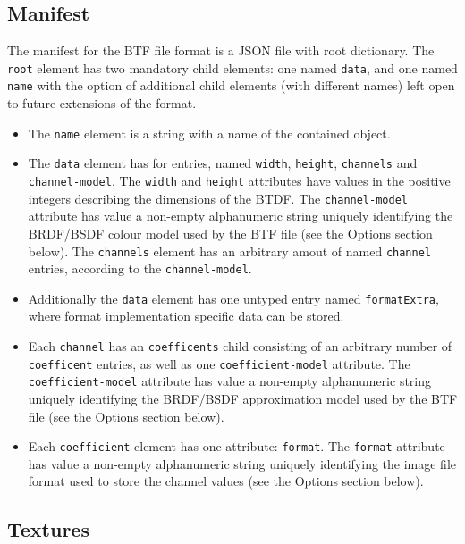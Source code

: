 \hypertarget{manifest}{%
\subsection{Manifest}\label{manifest}}

The manifest for the BTF file format is a JSON file with root
dictionary. The \texttt{root} element has two mandatory child elements:
one named \texttt{data}, and one named \texttt{name} with the option of
additional child elements (with different names) left open to future
extensions of the format.
\begin{itemize}
\item The \texttt{name} element is a string with a
name of the contained object.
\item The \texttt{data} element has for
entries, named \texttt{width}, \texttt{height}, \texttt{channels} and
\texttt{channel-model}. The \texttt{width} and \texttt{height}
attributes have values in the positive integers describing the
dimensions of the BTDF. The \texttt{channel-model} attribute has value a
non-empty alphanumeric string uniquely identifying the BRDF/BSDF colour
model used by the BTF file (see the Options section below). The \texttt{channels} element has an arbitrary amout of
named \texttt{channel} entries, according to the \texttt{channel-model}.
\item Additionally the \texttt{data} element has one untyped entry named
\texttt{formatExtra}, where format implementation specific data can be
stored.
\item Each \texttt{channel} has an \texttt{coefficents} child
consisting of an arbitrary number of \texttt{coefficent} entries, as
well as one \texttt{coefficient-model} attribute. The
\texttt{coefficient-model} attribute has value a non-empty alphanumeric
string uniquely identifying the BRDF/BSDF approximation model used by
the BTF file (see the Options section below).
\item Each \texttt{coefficient} element has one attribute: \texttt{format}.
The \texttt{format} attribute has value a non-empty alphanumeric string
uniquely identifying the image file format used to store the channel
values (see the Options section below).
\end{itemize}

\hypertarget{textures}{%
\subsection{Textures}\label{textures}}

